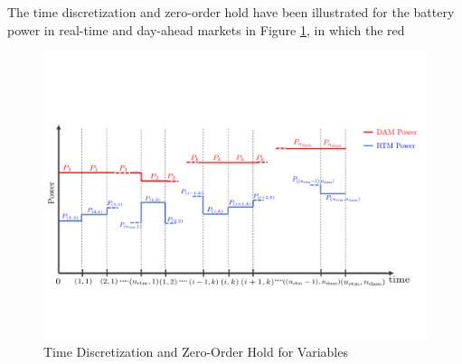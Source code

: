 \documentclass[11pt,twoside]{article}
\begin{document}
The time discretization and zero-order hold have been illustrated for the battery power in real-time and day-ahead markets in Figure \ref{fig:discretization}, in which the red 
\begin{figure}[h!]
\begin{center}
\includegraphics[scale=0.7]{Figures/discretization1.pdf} \caption{Time Discretization and Zero-Order Hold for Variables}\label{fig:discretization}\end{center}
\end{figure}
\FloatBarrier
\end{document}
